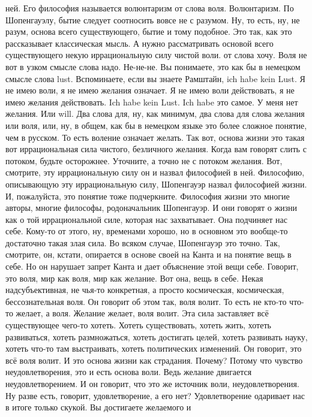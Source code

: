 ней. Его философия называется волюнтаризм от слова воля. Волюнтаризм. По
Шопенгауэлу, бытие следует соотносить вовсе не с разумом. Ну, то есть, ну, не
разум, основа всего существующего, бытие и тому подобное. Это так, как это
рассказывает классическая мысль. А нужно рассматривать основой всего
существующего некую иррациональную силу чистой воли. от слова хочу. Воля не вот
в узком смысле слова надо. Не-не-не. Вы понимаете, это как бы в немецком смысле
слова lust. Вспоминаете, если вы знаете Рамштайн, ich habe kein Lust. Я не имею
воли, я не имею желания означает. Я не имею воли действовать, я не имею желания
действовать. Ich habe kein Lust. Ich habe это самое. У меня нет желания. Или
will. Два слова для, ну, как минимум, два слова для слова желания или воля, или,
ну, в общем, как бы в немецком языке это более сложное понятие, чем в русском.
То есть воление означает желать. Так вот, основа жизни это такая вот
иррациональная сила чистого, безличного желания. Когда вам говорят слить с
потоком, будьте осторожнее. Уточните, а точно не с потоком желания. Вот,
смотрите, эту иррациональную силу он и назвал философией в ней. Философию,
описывающую эту иррациональную силу, Шопенгауэр назвал философией жизни. И,
пожалуйста, это понятие тоже подчеркните. Философия жизни это многие авторы,
многие философы, родоначальник Шопенгауэр. И они говорят о жизни как о той
иррациональной силе, которая нас захватывает. Она подчиняет нас себе. Кому-то от
этого, ну, временами хорошо, но в основном это вообще-то достаточно такая злая
сила. Во всяком случае, Шопенгауэр это точно. Так, смотрите, он, кстати,
опирается в основе своей на Канта и на понятие вещь в себе. Но он нарушает
запрет Канта и дает объяснение этой вещи себе. Говорит, это воля, мир как воля,
мир как желание. Вот она, вещь в себе. Некая надсубъективная, не чья-то
конкретная, а просто космическая, космическая, бессознательная воля. Он говорит
об этом так, воля волит. То есть не кто-то что-то желает, а воля. Желание
желает, воля волит. Эта сила заставляет всё существующее чего-то хотеть. Хотеть
существовать, хотеть жить, хотеть развиваться, хотеть размножаться, хотеть
достигать целей, хотеть развивать науку, хотеть что-то там выстраивать, хотеть
политических изменений. Он говорит, это всё воля волит. И это основа жизни как
страдания. Почему? Потому что чувство неудовлетворения, это и есть основа воли.
Ведь желание двигается неудовлетворением. И он говорит, что это же источник
воли, неудовлетворения. Ну разве есть, говорит, удовлетворение, а его нет?
Удовлетворение одаривает нас в итоге только скукой. Вы достигаете желаемого и
